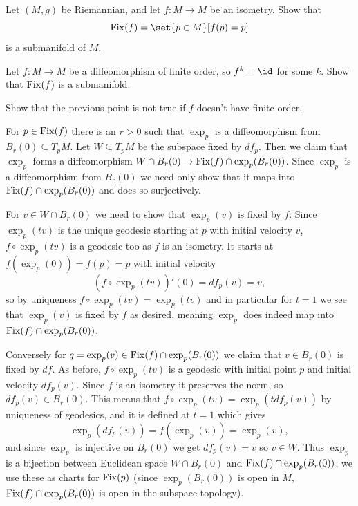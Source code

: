 \def\fix{{\rm Fix}}
\bprob

    \benum
        \item Let $(M,g)$ be Riemannian, and let $f\colon M\to M$ be an isometry.
        Show that
        $$ \fix(f) = \set{p\in M}[f(p)=p] $$
        is a submanifold of $M$.

        \item Let $f\colon M\to M$ be a diffeomorphism of finite order, so $f^k=\id$ for some $k$.
        Show that $\fix(f)$ is a submanifold.

        \item Show that the previous point is not true if $f$ doesn't have finite order.
    \eenum

\eprob

\benum
    \item For $p\in\fix(f)$ there is an $r>0$ such that $\exp_p$ is a diffeomorphism from $B_r(0)\subseteq T_pM$.
    Let $W\subseteq T_pM$ be the subspace fixed by $df_p$.
    Then we claim that $\exp_p$ forms a diffeomorphism $W\cap B_r(0)\to\fix(f)\cap\exp_p(B_r(0))$.
    Since $\exp_p$ is a diffeomorphism from $B_r(0)$ we need only show that it maps into $\fix(f)\cap\exp_p(B_r(0))$ and does so surjectively.

    For $v\in W\cap B_r(0)$ we need to show that $\exp_p(v)$ is fixed by $f$.
    Since $\exp_p(tv)$ is the unique geodesic starting at $p$ with initial velocity $v$, $f\circ\exp_p(tv)$ is a geodesic too as $f$ is an isometry.
    It starts at $f(\exp_p(0))=f(p)=p$ with initial velocity
    $$ (f\circ\exp_p(tv))'(0) = df_p(v) = v , $$
    so by uniqueness $f\circ\exp_p(tv)=\exp_p(tv)$ and in particular for $t=1$ we see that $\exp_p(v)$ is fixed by $f$ as desired, meaning
    $\exp_p$ does indeed map into $\fix(f)\cap\exp_p(B_r(0))$.

    Conversely for $q=\exp_p(v)\in\fix(f)\cap\exp_p(B_r(0))$ we claim that $v\in B_r(0)$ is fixed by $df$.
    As before, $f\circ\exp_p(tv)$ is a geodesic with initial point $p$ and initial velocity $df_p(v)$.
    Since $f$ is an isometry it preserves the norm, so $df_p(v)\in B_r(0)$.
    This means that $f\circ\exp_p(tv)=\exp_p(tdf_p(v))$ by uniqueness of geodesics, and it is defined at $t=1$ which gives
    $$ \exp_p(df_p(v)) = f(\exp_p(v)) = \exp_p(v) , $$
    and since $\exp_p$ is injective on $B_r(0)$ we get $df_p(v)=v$ so $v\in W$.
    Thus $\exp_p$ is a bijection between Euclidean space $W\cap B_r(0)$ and $\fix(f)\cap\exp_p(B_r(0))$, we use these as charts for $\fix(p)$ (since $\exp_p(B_r(0))$
    is open in $M$, $\fix(f)\cap\exp_p(B_r(0))$ is open in the subspace topology).

